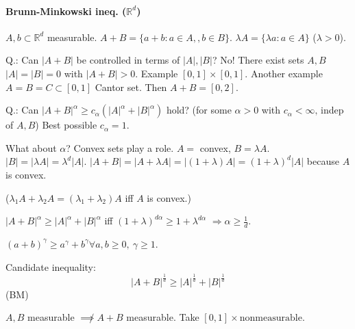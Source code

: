 \paragraph{Brunn-Minkowski ineq. ($ℝ^d$)}
$A,b⊂ℝ^d$ measurable. $A+B=\{a+b:a∈A,,b∈B\}$. $λA=\{λa:a∈A\}$ ($λ>0$).

Q.: Can $|A+B|$ be controlled in terms of $|A|,|B|$? No! There exist sets $A,B$ $|A|=|B|=0$ with $|A+B|>0$. Example $[0,1]\times[0,1]$. Another example $A=B=C⊂[0,1]$ Cantor set. Then $A+B=[0,2]$.

Q.: Can $|A+B|^α\geq c_α(|A|^α+|B|^α)$ hold? (for some $α>0$ with $c_α<∞‚$ indep of $A,B$) Best possible $c_α=1$.

What about $α$? Convex sets play a role. $A=$ convex, $B=λA$. $|B|=|λA|=λ^d|A|$. $|A+B|=|A+λA|=|(1+λ)A|=(1+λ)^d|A|$ because $A$ is convex.

($λ_1A+λ_2A=(λ_1+λ_2)A$ iff $A$ is convex.)

$|A+B|^α\geq |A|^α+|B|^α$ iff $(1+λ)^{dα}\geq 1+λ^{dα}$ $⇒α\geq\frac1d$.

$(a+b)^γ\geq a^γ+b^γ∀a,b\geq 0,\ γ\geq 1$.

Candidate inequality: \[|A+B|^{\frac1d}\geq|A|^{\frac1d}+|B|^{\frac1d}\](BM)

$A,B$ measurable $\not\implies A+B$ measurable. Take $[0,1]\times\text{nonmeasurable}$.

